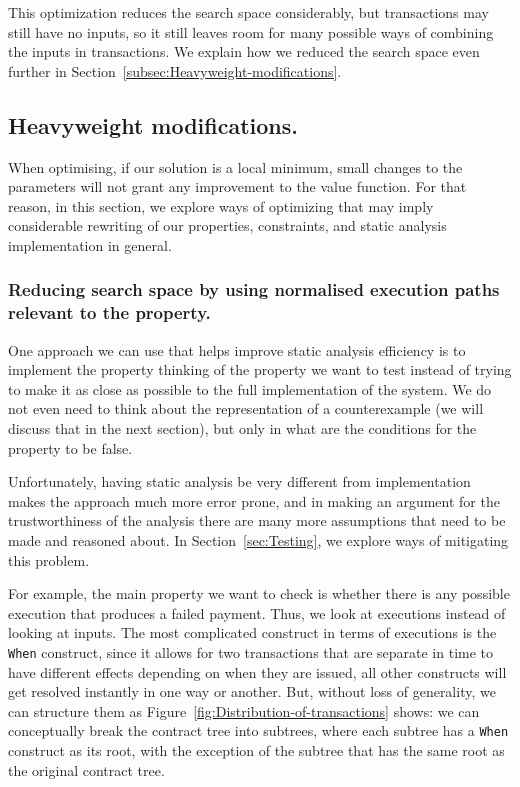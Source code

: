 \documentclass[english,runningheads]{llncs}
\begin{document}
This optimization reduces the search space considerably, but transactions
may still have no inputs, so it still leaves room for many possible
ways of combining the inputs in transactions. We explain how we reduced
the search space even further in Section~\ref{subsec:Heavyweight-modifications}. 

\subsection{Heavyweight modifications. \label{subsec:Heavyweight-modifications}}

When optimising, if our solution is a local minimum, small changes
to the parameters will not grant any improvement to the value function.
For that reason, in this section, we explore ways of optimizing that
may imply considerable rewriting of our properties, constraints, and
static analysis implementation in general.


\subsubsection{Reducing search space by using normalised execution paths relevant
to the property. \label{subsec:Reducing-search-space-by-using-normalised-execution-paths-relevant-to-the-property}}

One approach we can use that helps improve static analysis efficiency
is to implement the property thinking of the property we want to test
instead of trying to make it as close as possible to the full implementation
of the system. We do not even need to think about the representation
of a counterexample (we will discuss that in the next section), but
only in what are the conditions for the property to be false.

Unfortunately, having static analysis be very different from implementation
makes the approach much more error prone, and in making an argument
for the trustworthiness of the analysis there are many more assumptions
that need to be made and reasoned about. In Section~\ref{sec:Testing},
we explore ways of mitigating this problem.

For example, the main property we want to check is whether there is
any possible execution that produces a failed payment. Thus, we look
at executions instead of looking at inputs. The most complicated construct
in terms of executions is the \texttt{When} construct, since it allows
for two transactions that are separate in time to have different effects
depending on when they are issued, all other constructs will get resolved
instantly in one way or another. But, without loss of generality,
we can structure them as Figure~\ref{fig:Distribution-of-transactions}
shows: we can conceptually break the contract tree into subtrees,
where each subtree has a \texttt{When} construct as its root, with
the exception of the subtree that has the same root as the original
contract tree.
\end{document}
